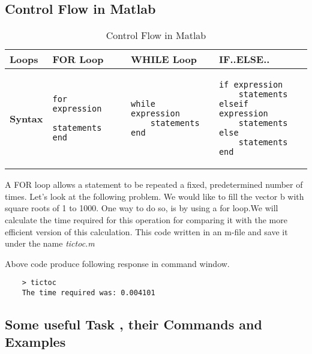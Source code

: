\documentclass[a4paper,11pt]{article}
\begin{document}
\subsection{Control Flow in Matlab}
\begin{table}[H]
    \centering
    \begin{tabular}[H]{| m{4em}| m{9em}|m{10em}|m{15em}|}
        \hline
        \rowcolor[rgb]{0.569,0.647,0.947} \textbf{Loops} & \textbf{FOR Loop} & \textbf{WHILE Loop} & \textbf{IF..ELSE..} \\
        \hline\hline
        \textbf{Syntax}                                  &
        \begin{verbatim}
for expression
    statements
end
        \end{verbatim}
                                                         &
        \begin{verbatim}
while expression
    statements
end
        \end{verbatim}
                                                         &
        \begin{verbatim}
if expression
    statements
elseif expression
    statements
else
    statements
end
\end{verbatim}
        \\
        \hline
    \end{tabular}
    \caption{Control Flow in Matlab}
\end{table}

A FOR loop allows a statement to be repeated a fixed, predetermined number of times. Let’s
look at the following problem. We would like to fill the vector b with square roots of 1 to 1000.
One way to do so, is by using a for loop.We will calculate the time required for this operation for comparing it with the more efficient version of this calculation.
This code written in an m-file and save it under the name \textit{tictoc.m}


Above code produce following response in command window.

\begin{verbatim}
    > tictoc
    The time required was: 0.004101
\end{verbatim}

\subsection{Some useful Task , their Commands and Examples}
\end{document}
